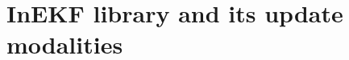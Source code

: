 \documentclass[report.tex]{subfiles}
\begin{document}




    
    \section{InEKF library and its update modalities}
    
    
    
    
\end{document}
